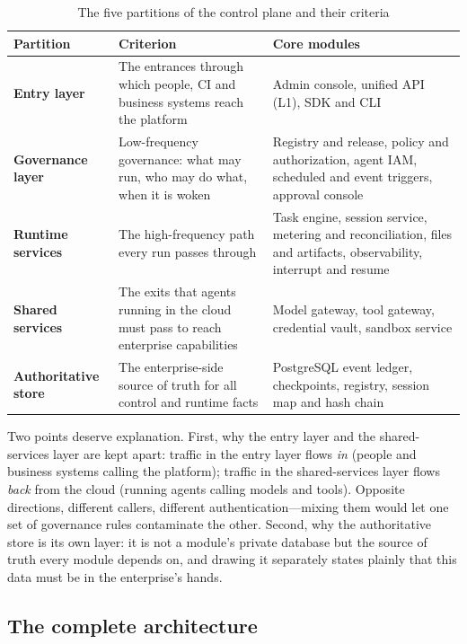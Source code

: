 \begin{table}[htbp]
\centering
\caption{The five partitions of the control plane and their criteria}
\label{tab:partitions}
\begin{tabularx}{\textwidth}{@{}>{\bfseries}L{3.0cm}L{5.4cm}Y@{}}
  \toprule
  \textbf{Partition} & \textbf{Criterion} & \textbf{Core modules}\\
  \midrule
  Entry layer & The entrances through which people, CI and business systems reach the platform & Admin console, unified API (L1), SDK and CLI\\
  Governance layer & Low-frequency governance: what may run, who may do what, when it is woken & Registry and release, policy and authorization, agent IAM, scheduled and event triggers, approval console\\
  Runtime services & The high-frequency path every run passes through & Task engine, session service, metering and reconciliation, files and artifacts, observability, interrupt and resume\\
  Shared services & The exits that agents running in the cloud must pass to reach enterprise capabilities & Model gateway, tool gateway, credential vault, sandbox service\\
  Authoritative store & The enterprise-side source of truth for all control and runtime facts & PostgreSQL event ledger, checkpoints, registry, session map and hash chain\\
  \bottomrule
\end{tabularx}
\end{table}

Two points deserve explanation. First, why the entry layer and the shared-services layer are kept apart: traffic in the entry layer flows \emph{in} (people and business systems calling the platform); traffic in the shared-services layer flows \emph{back} from the cloud (running agents calling models and tools). Opposite directions, different callers, different authentication---mixing them would let one set of governance rules contaminate the other. Second, why the authoritative store is its own layer: it is not a module's private database but the source of truth every module depends on, and drawing it separately states plainly that this data must be in the enterprise's hands.

\subsection{The complete architecture}

